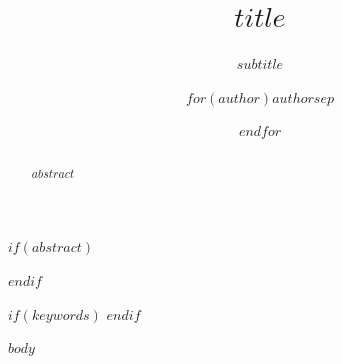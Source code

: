 \documentclass{llncs}
\title{$title$}
\subtitle{$subtitle$}
\author{$for(author)$$author$$sep$ \and $endfor$}
\institute{$if(institute)$$institute$$endif$}
\begin{document}
\maketitle

$if(abstract)$
\begin{abstract}
$abstract$
\end{abstract}
$endif$

$if(keywords)$
$endif$

$body$
\end{document}
